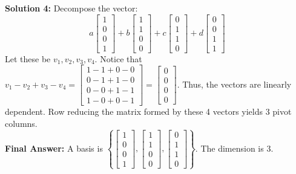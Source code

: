 \documentclass{article}
\begin{document}
\textbf{Solution 4:}
Decompose the vector:
$$ a \begin{bmatrix} 1 \\ 0 \\ 0 \\ 1 \end{bmatrix} + b \begin{bmatrix} 1 \\ 1 \\ 0 \\ 0 \end{bmatrix} + c \begin{bmatrix} 0 \\ 1 \\ 1 \\ 0 \end{bmatrix} + d \begin{bmatrix} 0 \\ 0 \\ 1 \\ 1 \end{bmatrix} $$
Let these be $v_1, v_2, v_3, v_4$. Notice that $v_1 - v_2 + v_3 - v_4 = \begin{bmatrix} 1-1+0-0 \\ 0-1+1-0 \\ 0-0+1-1 \\ 1-0+0-1 \end{bmatrix} = \begin{bmatrix} 0 \\ 0 \\ 0 \\ 0 \end{bmatrix}$. 
Thus, the vectors are linearly dependent. Row reducing the matrix formed by these 4 vectors yields 3 pivot columns. \\
\textbf{Final Answer:} A basis is $\left\{ \begin{bmatrix} 1 \\ 0 \\ 0 \\ 1 \end{bmatrix}, \begin{bmatrix} 1 \\ 1 \\ 0 \\ 0 \end{bmatrix}, \begin{bmatrix} 0 \\ 1 \\ 1 \\ 0 \end{bmatrix} \right\}$. The dimension is 3. \\
\end{document}
